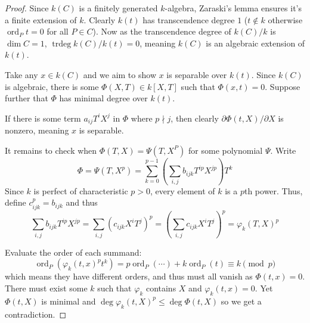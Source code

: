 \documentclass[12pt]{article}
\theoremstyle{remark}
\theoremstyle{definition}
\newcommand{\ord}[0]{\operatorname{ord}}
\newcommand{\trdeg}[0]{\operatorname{trdeg}}
\begin{document}
        \begin{proof}
            Since $k(C)$ is a finitely generated $k$-algebra, Zaraski's lemma ensures it's a finite extension of $k$. Clearly $k(t)$ has transcendence degree $1$ ($t\notin k$ otherwise $\ord_P t=0$ for all $P\in C$). Now as the transcendence degree of $k(C)/k$ is $\dim C=1$, $\trdeg k(C)/k(t)=0$, meaning $k(C)$ is an algebraic extension of $k(t)$.

            Take any $x\in k(C)$ and we aim to show $x$ is separable over $k(t)$. Since $k(C)$ is algebraic, there is some $\Phi(X, T)\in k[X, T]$ such that $\Phi(x, t)=0$. Suppose further that $\Phi$ has minimal degree over $k(t)$.

            If there is some term $a_{ij}T^iX^j$ in $\Phi$ where $p\nmid j$, then clearly $\partial\Phi(t, X)/\partial X$ is nonzero, meaning $x$ is separable.

            It remains to check when $\Phi(T, X)=\Psi(T, X^P)$ for some polynomial $\Psi$. Write
            \[\Phi=\Psi(T, X^p)=\sum_{k=0}^{p-1}\left(\sum_{i,j}b_{ijk}T^{ip}X^{jp}\right)T^k\]
            Since $k$ is perfect of characteristic $p>0$, every element of $k$ is a $p$th power. Thus, define $c_{ijk}^p=b_{ijk}$ and thus
            \[\sum_{i,j}b_{ijk}T^{ip}X^{jp}=\sum_{i,j}(c_{ijk}X^iT^j)^p=\left(\sum_{i,j}c_{ijk}X^iT^j\right)^p=\varphi_k(T, X)^p\]
            
            Evaluate the order of each summand:
            \[\ord_P(\varphi_k(t, x)^pt^k)=p\ord_P(\cdots)+k\ord_P(t)\equiv k\pmod{p}\]
            which means they have different orders, and thus must all vanish as $\Phi(t, x)=0$. There must exist some $k$ such that $\varphi_k$ contains $X$ and $\varphi_k(t, x)=0$. Yet $\Phi(t, X)$ is minimal and $\deg \varphi_k(t, X)^p\leqslant \deg \Phi(t, X)$ so we get a contradiction.
        \end{proof}
\end{document}
